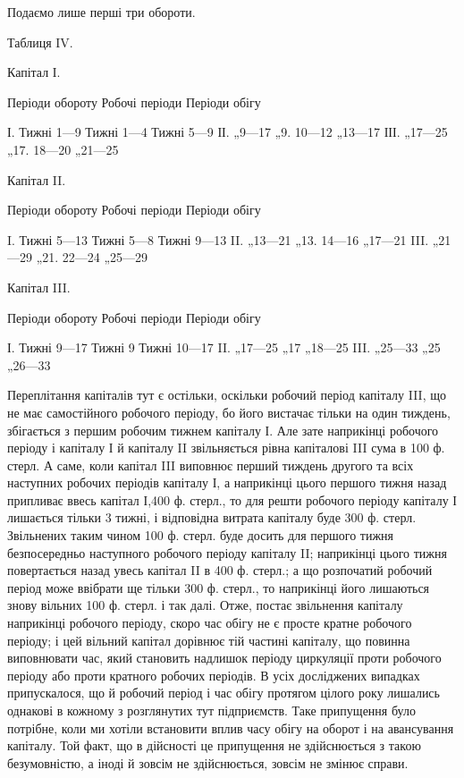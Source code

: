 Подаємо лише перші три обороти.

Таблиця IV.

Капітал І.

Періоди обороту Робочі періоди    Періоди обігу

І. Тижні 1—9 Тижні 1—4    Тижні 5—9
ІІ. „9—17 „9. 10—12 „13—17
ІІІ. „17—25 „17. 18—20 „21—25

Капітал II.

Періоди обороту Робочі періоди    Періоди обігу

I. Тижні 5—13  Тижні 5—8  Тижні 9—13
II. „13—21 „13. 14—16 „17—21
III. „21—29 „21. 22—24 „25—29

Капітал III.

Періоди обороту Робочі періоди    Періоди обігу

І. Тижні 9—17   Тижні 9 Тижні 10—17
II. „17—25 „17 „18—25
III. „25—33 „25 „26—33

Переплітання капіталів тут є остільки, оскільки робочий період капіталу
III, що не має самостійного робочого періоду, бо його вистачає
тільки на один тиждень, збігається з першим робочим тижнем капіталу І.
Але зате наприкінці робочого періоду і капіталу І й капіталу II
звільняється рівна капіталові III сума в 100 ф. стерл. А саме, коли капітал
III виповнює перший тиждень другого та всіх наступних робочих періодів
капіталу І, а наприкінці цього першого тижня назад припливає ввесь
капітал І,400 ф. стерл., то для решти робочого періоду капіталу І лишається
тільки 3 тижні, і відповідна витрата капіталу буде 300 ф. стерл. Звільнених
таким чином 100 ф. стерл. буде досить для першого тижня безпосередньо
наступного робочого періоду капіталу II; наприкінці цього тижня повертається
назад увесь капітал II в 400 ф. стерл.; а що розпочатий робочий
період може ввібрати ще тільки 300 ф. стерл., то наприкінці його лишаються
знову вільних 100 ф. стерл. і так далі. Отже, постає звільнення капіталу
наприкінці робочого періоду, скоро час обігу не є просте кратне
робочого періоду; і цей вільний капітал дорівнює тій частині капіталу,
що повинна виповнювати час, який становить надлишок періоду циркуляції
проти робочого періоду або проти кратного робочих періодів.
В усіх досліджених випадках припускалося, що й робочий період і
час обігу протягом цілого року лишались однакові в кожному з розглянутих
тут підприємств. Таке припущення було потрібне, коли ми хотіли
встановити вплив часу обігу на оборот і на авансування капіталу. Той
факт, що в дійсності це припущення не здійснюється з такою безумовністю,
а іноді й зовсім не здійснюється, зовсім не змінює справи.

